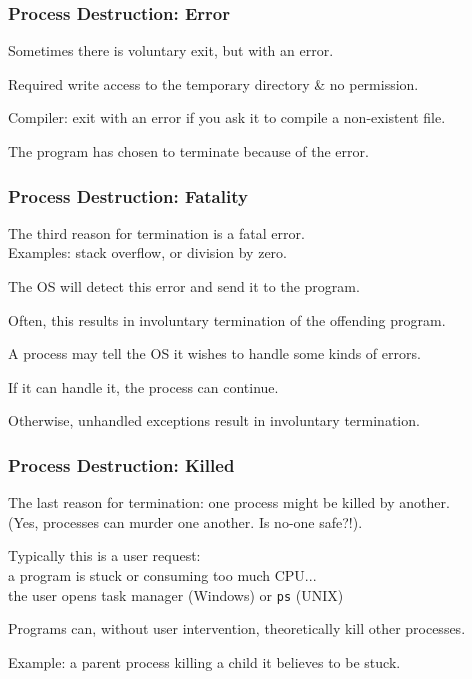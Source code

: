 \begin{frame}
\frametitle{Process Destruction: Error}

Sometimes there is voluntary exit, but with an error. 

Required write access to the temporary directory \& no permission.

Compiler: exit with an error if you ask it to compile a non-existent file.

The program has chosen to terminate because of the error.

\end{frame}

\begin{frame}
\frametitle{Process Destruction: Fatality}

The third reason for termination is a fatal error.\\
\quad Examples: stack overflow, or division by zero. 

The OS will detect this error and send it to the program. 

Often, this results in involuntary termination of the offending program. 

A process may tell the OS it wishes to handle some kinds of errors.

If it can handle it, the process can continue.

Otherwise, unhandled exceptions result in involuntary termination.

\end{frame}

\begin{frame}
\frametitle{Process Destruction: Killed}

The last reason for termination: one process might be killed by another.\\
\quad (Yes, processes can murder one another. Is no-one safe?!). 

Typically this is a user request:\\
\quad a program is stuck or consuming too much CPU...\\
\quad the user opens task manager (Windows) or \texttt{ps} (UNIX)

Programs can, without user intervention, theoretically kill other processes. 

Example: a parent process killing a child it believes to be stuck.

\end{frame}

